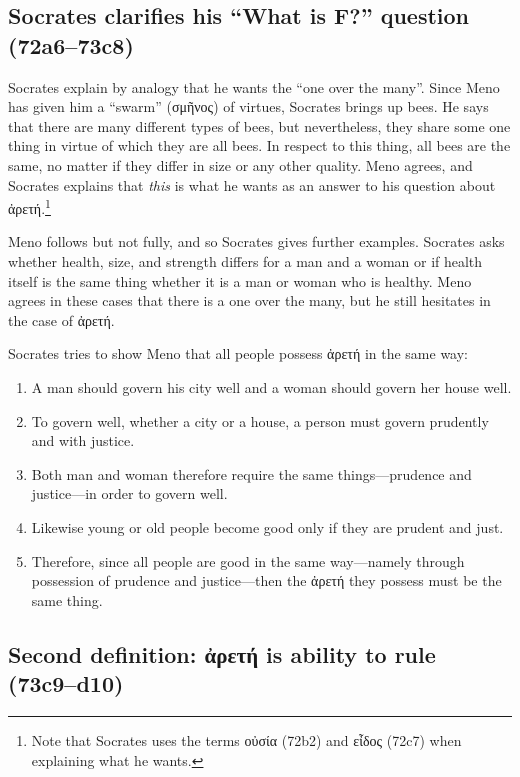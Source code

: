 \documentclass[12pt,letterpaper]{article}
\begin{document}
\subsection*{Socrates clarifies his ``What is F?'' question (72a6--73c8)}

Socrates explain by analogy that he wants the ``one over the many''. Since Meno has given him a ``swarm'' (\textgreek{σμῆνος}) of virtues, Socrates brings up bees. He says that there are many different types of bees, but nevertheless, they share some one thing in virtue of which they are all bees. In respect to this thing, all bees are the same, no matter if they differ in size or any other quality. Meno agrees, and Socrates explains that \textit{this} is what he wants as an answer to his question about \textgreek{ἀρετή}.\footnote{Note that Socrates uses the terms \textgreek{οὐσία} (72b2) and \textgreek{εἶδος} (72c7) when explaining what he wants.}

Meno follows but not fully, and so Socrates gives further examples. Socrates asks whether health, size, and strength differs for a man and a woman or if health itself is the same thing whether it is a man or woman who is healthy. Meno agrees in these cases that there is a one over the many, but he still hesitates in the case of \textgreek{ἀρετή}.

Socrates tries to show Meno that all people possess \textgreek{ἀρετή} in the same way:

\begin{enumerate}
    \item A man should govern his city well and a woman should govern her house well.
    \item To govern well, whether a city or a house, a person must govern prudently and with justice.
    \item Both man and woman therefore require the same things—prudence and justice—in order to govern well.
    \item Likewise young or old people become good only if they are prudent and just.
    \item Therefore, since all people are good in the same way—namely through possession of prudence and justice---then the \textgreek{ἀρετή} they possess must be the same thing.
\end{enumerate}

\subsection*{Second definition: \textgreek{ἀρετή} is ability to rule (73c9--d10)}
\end{document}
